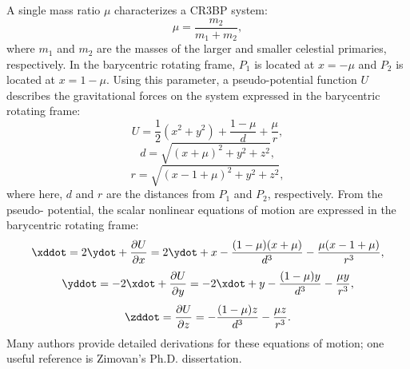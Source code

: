 A single mass ratio $\mu$ characterizes a CR3BP system:
\begin{equation}
    \mu=\frac{m_{2}}{m_{1}+m_{2}},
    \label{eq:mu}
\end{equation}
where $m_{1}$ and $m_{2}$ are the masses of the larger and smaller celestial primaries,
respectively. In the barycentric rotating frame, $P_{1}$ is located at $x=-\mu$ and $P_{2}$ is
located at $x=1-\mu$. Using this parameter, a pseudo-potential function $U$ describes the
gravitational forces on the system expressed in the barycentric rotating frame:
\begin{equation}
    U=\frac{1}{2}(x^{2}+y^{2})+\frac{1-\mu}{d}+\frac{\mu}{r},
    \label{eq:pseudopotential}
\end{equation}
\begin{equation}
    d=\sqrt{(x+\mu)^{2}+y^{2}+z^{2}},
    \label{eq:P1distance}
\end{equation}
\begin{equation}
    r=\sqrt{(x-1+\mu)^{2}+y^{2}+z^{2}},
    \label{eq:P2distance}
\end{equation}
where here, $d$ and $r$ are the distances from $P_{1}$ and $P_{2}$, respectively. From the pseudo-
potential, the scalar nonlinear equations of motion are expressed in the barycentric rotating
frame:
\begin{equation}
    \xddot=2\ydot+\frac{\partial U}{\partial x}=2\ydot+x-\frac{(1-\mu)(x+\mu)}{d^{3}}-\frac{\mu(x-1+\mu)}{r^{3}},
    \label{eq:EoMx}
\end{equation}
\begin{equation}
    \yddot=-2\xdot+\frac{\partial U}{\partial y}=-2\xdot+y-\frac{(1-\mu)y}{d^{3}}-\frac{\mu y}{r^{3}},
    \label{eq:EoMy}
\end{equation}
\begin{equation}
    \zddot=\frac{\partial U}{\partial z}=-\frac{(1-\mu)z}{d^{3}}-\frac{\mu z}{r^{3}}.
    \label{eq:EoMz}
\end{equation}
Many authors provide detailed derivations for these equations of motion; one useful reference is
Zimovan's Ph.D. dissertation\cite{Zimovan:2017}.

